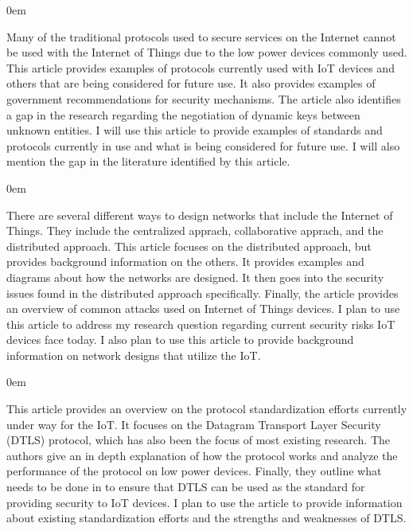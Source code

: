 \documentclass{article}
\newenvironment{annotation}{\begin{addmargin}[2.5em]{0em} \begin{flushleft}}{\end{flushleft} \end{addmargin}}
\begin{document}
\begin{annotation}
Many of the traditional protocols used to secure services on the Internet cannot be used with the Internet of Things due to the low power devices commonly used. This article provides examples of protocols
currently used with IoT devices and others that are being considered for future use. It also provides examples of government recommendations for security mechanisms. The article also identifies a gap in the 
research regarding the negotiation of dynamic keys between unknown entities. I will use this article to provide examples of standards and protocols currently in use and what is being considered for future use. I will also mention the gap in the literature identified by this article.
\end{annotation}

\begin{annotation}
There are several different ways to design networks that include the Internet of Things. They include the centralized apprach, collaborative apprach, and the distributed approach. This article focuses on the
distributed approach, but provides background information on the others. It provides examples and diagrams about how the networks are designed. It then goes into the security issues found in the distributed
approach specifically. Finally, the article provides an overview of common attacks used on Internet of Things devices. I plan to use this article to address my research question regarding current security
risks IoT devices face today. I also plan to use this article to provide background information on network designs that utilize the IoT. 
\end{annotation}

\begin{annotation}
This article provides an overview on the protocol standardization efforts currently under way for the IoT. It focuses on the Datagram Transport Layer Security (DTLS) protocol, which has also been the focus of most
existing research. The authors give an in depth explanation of how the protocol works and analyze the performance of the protocol on low power devices. Finally, they outline what needs to be done in to 
ensure that DTLS can be used as the standard for providing security to IoT devices. I plan to use the article to provide information about existing standardization efforts and the strengths and weaknesses of DTLS. 
\end{annotation}
\end{document}
